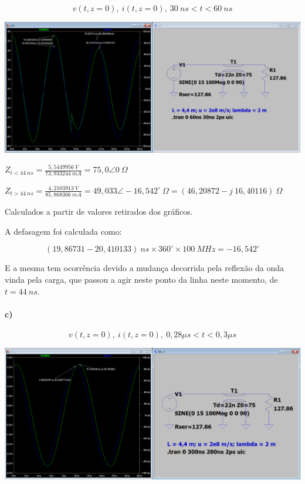 \documentclass[12pt,a4paper]{article}
\begin{document}
$$v(t,z=0),\ i(t,z=0),\ 30\ ns < t < 60\ ns$$

\begin{center}
    \includegraphics[scale=0.31]{2 b.png}
\end{center}

$Z_{t<44\ ns}=\frac{5,5449956\ V}{73,933244\ mA}=75,0\angle 0 \ \Omega$

$Z_{t>44\ ns}=\frac{4,2103913\ V}{85,868366\ mA}=49,033\angle -16,542^\circ \ \Omega =(46,20872 -j\ 16,40116)\ \Omega $

Calculados a partir de valores retirados dos gráficos.

A defasagem foi calculada como:

$$(19,86731-20,410133)\ ns \times 360^\circ \times 100\ MHz = -16,542^\circ$$

E a mesma tem ocorrência devido a mudança decorrida pela reflexão da onda vinda pela carga, que passou a agir neste ponto da linha neste momento, de $t=44\ ns$.

\paragraph{c)}

$$v(t,z=0),\ i(t,z=0),\ 0,28\mu s < t < 0,3 \mu s$$
\vspace{-45pt}
\begin{center}
    \includegraphics[scale=0.34]{2 c.png}
\end{center}
\end{document}
